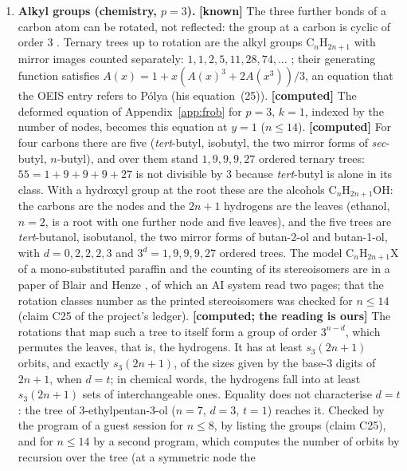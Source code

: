 \documentclass[11pt]{article}
\theoremstyle{definition}
\theoremstyle{remark}
\numberwithin{equation}{section}
\numberwithin{figure}{section}
\begin{document}
\begin{enumerate}[leftmargin=1.6em,itemsep=3pt]
\item \textbf{Alkyl groups (chemistry, $p=3$).} \textbf{[known]} The three further bonds of a carbon atom can
be rotated, not reflected: the group at a carbon is cyclic of order $3$ \cite{RHB}. Ternary trees up to
rotation are the alkyl groups C$_n$H$_{2n+1}$ with mirror images counted separately:
$1,1,2,5,11,28,74,\dots$ \cite{OEISA000625}; their generating function satisfies
$A(x)=1+x(A(x)^3+2A(x^3))/3$, an equation that the OEIS entry refers to P\'olya \cite{Polya} (his
equation~(25)). \textbf{[computed]} The deformed equation of Appendix~\ref{app:frob} for $p=3$, $k=1$,
indexed by the number of nodes, becomes this equation at $y=1$ ($n\le14$). \textbf{[computed]} For four
carbons there are five (\emph{tert}-butyl,
isobutyl, the two mirror forms of \emph{sec}-butyl, $n$-butyl), and over them stand $1,9,9,9,27$ ordered
ternary trees: $55=1+9+9+9+27$ is not divisible by $3$ because \emph{tert}-butyl is alone in its class.
With a hydroxyl group at the root these are the alcohols C$_n$H$_{2n+1}$OH: the carbons are the nodes and the
$2n+1$ hydrogens are the leaves (ethanol, $n=2$, is a root with one further node and five leaves), and the
five trees are \emph{tert}-butanol, isobutanol, the two mirror forms of butan-2-ol and butan-1-ol, with
$d=0,2,2,2,3$ and $3^d=1,9,9,9,27$ ordered trees. The model C$_n$H$_{2n+1}$X of a mono-substituted paraffin
and the counting of its stereoisomers are in a paper of Blair and Henze \cite{BlairHenze}, of which an AI
system read two pages; that the rotation classes number as the printed stereoisomers was checked for
$n\le14$ (claim C25 of the project's ledger). \textbf{[computed; the reading is ours]} The rotations that
map such a tree to itself form a group of order $3^{n-d}$, which permutes the leaves, that is, the
hydrogens. It has at least $s_3(2n+1)$ orbits, and exactly $s_3(2n+1)$, of the sizes given by the base-$3$
digits of $2n+1$, when $d=t$; in chemical words, the hydrogens fall into at least $s_3(2n+1)$ sets of
interchangeable ones. Equality does not characterise $d=t$: the tree of 3-ethylpentan-3-ol ($n=7$, $d=3$,
$t=1$) reaches it. Checked by the program of a guest session for $n\le8$, by listing the groups (claim C25), and for $n\le14$ by a
second program, which computes the number of orbits by recursion over the tree (at a symmetric node the

\end{enumerate}
\end{document}
